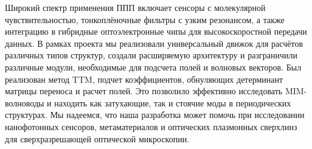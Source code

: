 \documentclass{article}
\begin{document}
Широкий спектр применения ППП включает сенсоры с молекулярной чувствительностью, тонкоплёночные фильтры с узким резонансом, а также интеграцию в гибридные оптоэлектронные чипы для высокоскоростной передачи данных. В рамках проекта мы реализовали универсальный движок для расчётов различных типов структур, создали расширяемую архитектуру и разграничили различные модули, необходимые для подсчета полей и волновых векторов. Был реализован метод TTM, подчет коэффициентов, обнуляющих детерминант матрицы переноса и расчет полей. Это позволило эффективно исследовать MIM-волноводы и находить как затухающие, так и стоячие моды в периодических структурах. Мы надеемся, что наша разработка может помочь при исследовании нанофотонных сенсоров, метаматериалов и оптических плазмонных сверхлинз для сверхразрешающей оптической микроскопии.
\end{document}
